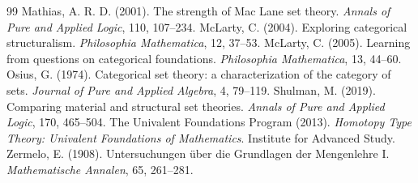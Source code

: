 \documentclass{situationist-preprint}
\begin{document}
\begin{thebibliography}{99}
 Mathias, A. R. D. (2001). The strength of Mac Lane set theory. \emph{Annals of Pure and Applied Logic}, 110, 107--234.
 McLarty, C. (2004). Exploring categorical structuralism. \emph{Philosophia Mathematica}, 12, 37--53.
 McLarty, C. (2005). Learning from questions on categorical foundations. \emph{Philosophia Mathematica}, 13, 44--60.
 Osius, G. (1974). Categorical set theory: a characterization of the category of sets. \emph{Journal of Pure and Applied Algebra}, 4, 79--119.
 Shulman, M. (2019). Comparing material and structural set theories. \emph{Annals of Pure and Applied Logic}, 170, 465--504.
 The Univalent Foundations Program (2013). \emph{Homotopy Type Theory: Univalent Foundations of Mathematics}. Institute for Advanced Study.
 Zermelo, E. (1908). Untersuchungen über die Grundlagen der Mengenlehre I. \emph{Mathematische Annalen}, 65, 261--281.
\end{thebibliography}
\end{document}

